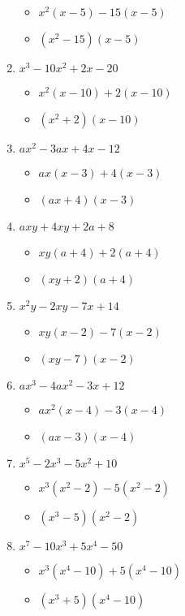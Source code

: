 \documentclass{article}
\begin{document}
\begin{enumerate}
  \begin{itemize}
  \item $x^{2}(x-5)-15(x-5)$
  \item $(x^{2}-15)(x-5)$
  \end{itemize}
\item $x^{3} - 10x^{2} + 2x - 20$
  \begin{itemize}
  \item $x^{2}(x-10)+2(x-10)$
  \item $(x^{2}+2)(x-10)$
  \end{itemize}
\item $ax^{2} - 3ax + 4x - 12$
  \begin{itemize}
  \item $ax(x-3)+4(x-3)$
  \item $(ax+4)(x-3)$
  \end{itemize}
\item $axy + 4xy + 2a + 8$
  \begin{itemize}
  \item $xy(a+4)+2(a+4)$
  \item $(xy+2)(a+4)$
  \end{itemize}
\item $x^{2}y - 2xy - 7x + 14$
  \begin{itemize}
  \item $xy(x-2)-7(x-2)$
  \item $(xy-7)(x-2)$
  \end{itemize}
\item $ax^{3} - 4ax^{2} - 3x + 12$
  \begin{itemize}
  \item $ax^{2}(x-4)-3(x-4)$
  \item $(ax-3)(x-4)$
  \end{itemize}
\item $x^{5} - 2x^{3} - 5x^{2} + 10$
  \begin{itemize}
  \item $x^{3}(x^{2}-2)-5(x^{2}-2)$
  \item $(x^{3}-5)(x^{2}-2)$
  \end{itemize}
\item $x^{7} - 10x^{3} + 5x^{4} - 50$
  \begin{itemize}
  \item $x^{3}(x^{4}-10)+5(x^{4}-10)$
  \item $(x^{3}+5)(x^{4}-10)$
  \end{itemize}

\end{enumerate}
\end{document}
